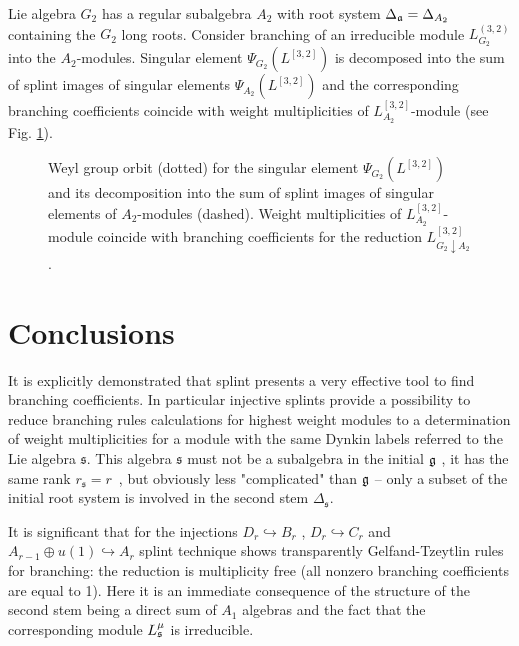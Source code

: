 \vspace{10mm}
\begin{example}
   Lie algebra $G_{2}$ has a regular subalgebra $A_{2}$ with root system $\Delta_{\mathfrak{a}}=\Delta_{A_{2}}$ containing the $G_{2}$ long roots. Consider branching of an irreducible module $L_{G_{2}}^{(3,2)}$ into the $A_{2}$-modules. Singular element $\Psi_{G_{2}}(L^{[3,2]})$ is decomposed into the sum of splint images of singular elements $\Psi_{A_{2}}(L^{[3,2]})$ and the corresponding branching coefficients coincide with weight multiplicities of $L^{[3,2]}_{A_{2}}$-module (see Fig. \ref{fig:g2_splint}).


  \begin{figure}[h!bt]
  \noindent\centering{
   \texttt{[image: g2]}
  }

  \caption{Weyl group orbit (dotted) for the singular element $\Psi_{G_{2}}(L^{[3,2]})$ and its decomposition into the sum of splint images of singular elements of $A_{2}$-modules (dashed). Weight multiplicities of $L^{[3,2]}_{A_{2}}$-module coincide with branching coefficients for the reduction $L^{[3,2]}_{G_{2}\downarrow A_{2}}$.}


 \label{fig:g2_splint}
\end{figure}

\end{example}

\section{Conclusions}

\label{sec:conclusions}It is explicitly demonstrated that splint
presents a very effective tool to find branching coefficients. In
particular injective splints provide a possibility to reduce
branching rules calculations for highest weight modules to a
determination of weight multiplicities for a module with the same
Dynkin labels referred to the Lie algebra $\mathfrak{s}$. This algebra
$\mathfrak{s}$ must not be a subalgebra in the initial $\mathfrak{g}$ , it
has the same rank $r_{\mathfrak{s}}=r$\ , but obviously less
"complicated" than $\mathfrak{g}$ -- only a subset of the initial root system is involved in the second stem $\Delta_{\mathfrak{s}}$.

It is significant that for the injections $D_{r}\hookrightarrow B_{r}$ , $%
D_{r}\hookrightarrow C_{r}$ and $A_{r-1}\oplus u\left( 1\right) \hookrightarrow A_{r}$ splint technique shows
transparently Gelfand-Tzeytlin rules for branching:  the reduction is
multiplicity free (all nonzero
branching coefficients are equal to 1). Here it is an immediate consequence of the
structure of the second stem being a direct sum of $A_{1}$
algebras and the fact that the corresponding module
$L_{\frak{s}}^{\mu }$ is irreducible.


